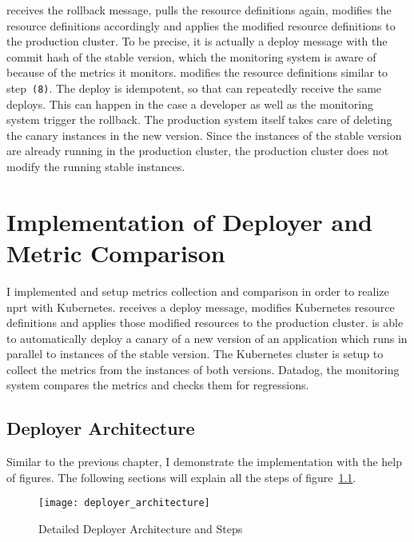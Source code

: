\deployer{} receives the rollback message, pulls the resource definitions again, modifies the
resource definitions accordingly and applies the modified resource definitions to the
production cluster. To be precise, it is actually a deploy message with the commit
hash of the stable version, which the monitoring system is aware of because of the metrics
it monitors. \deployer{} modifies the resource definitions similar to step~\texttt{(8)}. The
deploy is idempotent, so that \deployer{} can repeatedly receive the same deploys. This
can happen in the case a developer as well as the monitoring system trigger the
rollback. The production system itself takes care of deleting the canary instances in the
new version. Since the instances of the stable version are already running in the
production cluster, the production cluster does not modify the running stable instances.

\chapter{Implementation of Deployer and Metric Comparison}
\label{chap:detail}

I implemented \deployer{} and setup metrics collection and comparison in order to realize
\gls{nprt} with Kubernetes. \deployer{} receives a deploy message, modifies Kubernetes
resource definitions and applies those modified resources to the production
cluster. \deployer{} is able to automatically deploy a canary of a new version of an
application which runs in parallel to instances of the stable version. The Kubernetes
cluster is setup to collect the metrics from the instances of both versions. Datadog, the
monitoring system compares the metrics and checks them for regressions.

\section{Deployer Architecture}

Similar to the previous chapter, I demonstrate the implementation with the help of
figures. The following sections will explain all the steps of
figure~\ref{fig:deployer_architecture}.

\begin{figure}[htbp]
  \centering
  \texttt{[image: deployer\_architecture]}
  \caption{Detailed Deployer Architecture and Steps}
  \label{fig:deployer_architecture}
\end{figure}

